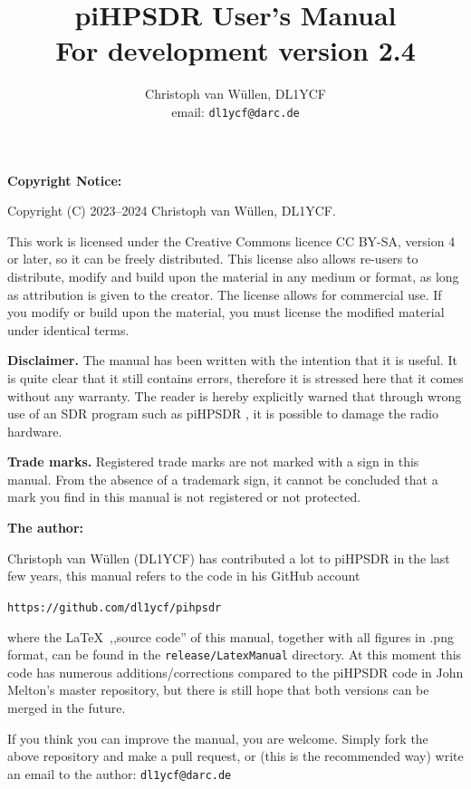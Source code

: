 \documentclass[12pt]{book}
\def\pH{pi\-HPSDR }
\begin{document}
\frontmatter
\title{
\pH User's Manual \\
\small{For development version 2.4}
}
\author{
Christoph van W\"ullen, DL1YCF \\
email: \texttt{dl1ycf@darc.de}
}

\maketitle
\textbf{Copyright Notice:}

Copyright (C) 2023--2024 Christoph van W\"ullen, DL1YCF.

This work is licensed under
the Creative Commons licence CC BY-SA, version 4 or later, so it can be freely distributed.
 This license also allows re-users to distribute, modify and build upon the material in any medium or format,
as long as attribution is given to the creator. The license allows for commercial use.
If you modify or build upon the material, you must license the modified material under identical terms.

\textbf{Disclaimer.} The manual has been written with the intention that it is useful. It is quite clear
that it still contains errors, therefore it is stressed here that it comes without any warranty. The reader
is hereby explicitly warned that through wrong use of an SDR program such as \pH, it is possible to
damage the radio hardware.

\textbf{Trade marks.} Registered trade marks are not marked with a sign in this manual. From the absence of
a trademark sign, it cannot be concluded that a mark you find in this manual is not registered or not
protected.

\bigskip
\textbf{The author:}

Christoph van W\"ullen (DL1YCF) has contributed a lot to \pH in the last few years, this manual refers
to the code in his GitHub account

\texttt{https://github.com/dl1ycf/pihpsdr}

where the \LaTeX\   ,,source code'' of this manual, together with all figures in .png format, can be found
in the \texttt{release/LatexManual} directory. At this moment this code has numerous additions/corrections
 compared
to the \pH code in John Melton's master repository, but there is still hope that both versions can
be merged in  the  future.

If you think you can improve the manual, you are welcome.
Simply fork the above repository and make a pull request, or (this is the recommended way) write an
email to the author: \texttt{dl1ycf@darc.de}
\tableofcontents
\mainmatter
\end{document}
